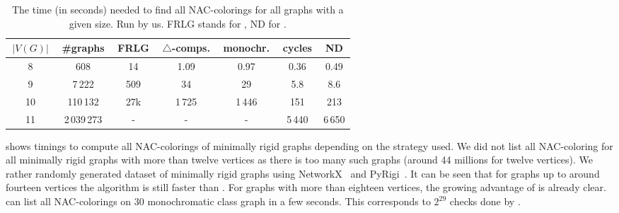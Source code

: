 \begin{table}[ht]
	\caption[Running times on graphs.]{
		The time (in seconds) needed to find all NAC-colorings for all graphs with a given size. Run by us.
		\textsc{FRLG} stands for \flexrilog{}, \textsc{ND} for \NeighborsDegree{}.}%
	\label{tab:all_min_rigid}
	\vspace{0.3cm}
	\centering
	\begin{tabular}{ccccccc}
		\hline
		\,$|V(G)|$\, & \,\#graphs\, & \,FRLG\, & \,$\triangle$-comps.\, & \,monochr.\, & \,cycles\, & \,\textsc{ND}\, \\
		\hline
		8            & 608          & 14       & 1.09                   & 0.97         & 0.36       & 0.49            \\
		9            & 7\,222       & 509      & 34                     & 29           & 5.8        & 8.6             \\
		10           & 110\,132     & 27k      & 1\,725                 & 1\,446       & 151        & 213             \\
		11           & 2\,039\,273  & -        & -                      & -            & 5\,440     & 6\,650          \\
		\hline
	\end{tabular}
\end{table}

shows timings to compute all NAC-colorings of minimally rigid graphs
depending on the strategy used.
We did not list all NAC-coloring for all minimally rigid graphs with more than twelve vertices
as there is too many such graphs (around 44 millions for twelve vertices).
%
We rather randomly generated dataset of minimally rigid graphs
using NetworkX~\cite{networkx} and PyRigi~\cite{pyrigi}.
%
It can be seen that for graphs up to around fourteen vertices the \NaiveCycles{} algorithm
is still faster than \Subgraphs{}.
For graphs with more than eighteen vertices,
the growing advantage of \Subgraphs{} is already clear.
\Subgraphs{} can list all NAC-colorings on 30 monochromatic class graph in a few seconds.
This corresponds to \( 2^{29} \) checks done by \NaiveCycles{}.

